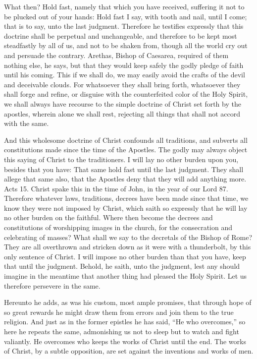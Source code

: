 What then? Hold fast, namely that which you have received, suffering it not to be plucked out of your hands: Hold fast I say, with tooth and nail, until I come; that is to say, unto the last judgment. Therefore he testifies expressly that this doctrine shall be perpetual and unchangeable, and therefore to be kept most steadfastly by all of us, and not to be shaken from, though all the world cry out and persuade the contrary. Arethas, Bishop of Caesarea, required of them nothing else, he says, but that they would keep safely the godly pledge of faith until his coming. This if we shall do, we may easily avoid the crafts of the devil and deceivable clouds. For whatsoever they shall bring forth, whatsoever they shall forge and refine, or disguise with the counterfeited color of the Holy Spirit, we shall always have recourse to the simple doctrine of Christ set forth by the apostles, wherein alone we shall rest, rejecting all things that shall not accord with the same.

And this wholesome doctrine of Christ confounds all traditions, and subverts all constitutions made since the time of the Apostles. The godly may always object this saying of Christ to the traditioners. I will lay no other burden upon you, besides that you have: That same hold fast until the last judgment. They shall allege that same also, that the Apostles deny that they will add anything more. Acts 15. Christ spake this in the time of John, in the year of our Lord 87. Therefore whatever laws, traditions, decrees have been made since that time, we know they were not imposed by Christ, which saith so expressly that he will lay no other burden on the faithful. Where then become the decrees and constitutions of worshipping images in the church, for the consecration and celebrating of masses? What shall we say to the decretals of the Bishop of Rome? They are all overthrown and stricken down as it were with a thunderbolt, by this only sentence of Christ. I will impose no other burden than that you have, keep that until the judgment. Behold, he saith, unto the judgment, lest any should imagine in the meantime that another thing had pleased the Holy Spirit. Let us therefore persevere in the same.

Hereunto he adds, as was his custom, most ample promises, that through hope of so great rewards he might draw them from errors and join them to the true religion. And just as in the former epistles he has said, “He who overcomes,” so here he repeats the same, admonishing us not to sleep but to watch and fight valiantly. He overcomes who keeps the works of Christ until the end. The works of Christ, by a subtle opposition, are set against the inventions and works of men.

